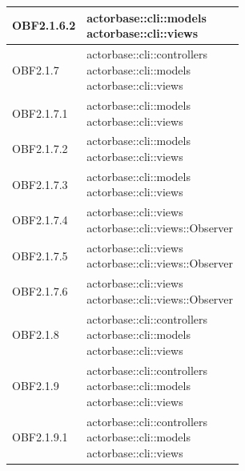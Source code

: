 \documentclass{scalatekids-article}
\begin{document}
\begin{longtable}[H]{|p{6cm}|p{11cm}|}
\hline
OBF2.1.6.2 & \multiLineCell[t]{actorbase::cli::models\\actorbase::cli::views\\}\\
\hline
OBF2.1.7 & \multiLineCell[t]{actorbase::cli::controllers\\actorbase::cli::models\\actorbase::cli::views\\}\\
\hline
OBF2.1.7.1 & \multiLineCell[t]{actorbase::cli::models\\actorbase::cli::views\\}\\
\hline
OBF2.1.7.2 & \multiLineCell[t]{actorbase::cli::models\\actorbase::cli::views\\}\\
\hline
OBF2.1.7.3 & \multiLineCell[t]{actorbase::cli::models\\actorbase::cli::views\\}\\
\hline
OBF2.1.7.4 & \multiLineCell[t]{actorbase::cli::views\\actorbase::cli::views::Observer\\}\\
\hline
OBF2.1.7.5 & \multiLineCell[t]{actorbase::cli::views\\actorbase::cli::views::Observer\\}\\
\hline
OBF2.1.7.6 & \multiLineCell[t]{actorbase::cli::views\\actorbase::cli::views::Observer\\}\\
\hline
OBF2.1.8 & \multiLineCell[t]{actorbase::cli::controllers\\actorbase::cli::models\\actorbase::cli::views\\}\\
\hline
OBF2.1.9 & \multiLineCell[t]{actorbase::cli::controllers\\actorbase::cli::models\\actorbase::cli::views\\}\\
\hline
OBF2.1.9.1 & \multiLineCell[t]{actorbase::cli::controllers\\actorbase::cli::models\\actorbase::cli::views\\}\\
\hline

\end{longtable}
\end{document}
